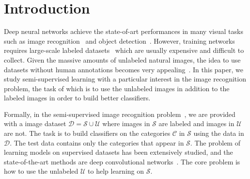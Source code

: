 \documentclass[runningheads]{llncs}
\begin{document}
\vspace{-0.3in}\section{Introduction}%
Deep neural networks achieve the state-of-art performances in many visual tasks such as
image recognition~\cite{resnet,densenet,alexnet,fewshot,vggnet,GoogleNet,sort,znfnet,gunn} and
object detection~\cite{deeplab,rich,fcnn,fasterrcnn}.
However, training networks requires large-scale labeled datasets~\cite{ILSVRC15,coco} which are usually expensive and difficult to collect.
Given the massive amounts of unlabeled natural images, the idea to use datasets without human annotations becomes very appealing~\cite{ssl}.
In this paper, we study semi-supervised learning with a particular interest in the image recognition problem, the task of which is to use the unlabeled images in addition to the labeled images in order to build better classifiers.

Formally, in the semi-supervised image recognition problem~\cite{stoc_trans,tessl,badgan}, we are provided with a image dataset $\mathcal{D}=\mathcal{S}\cup\mathcal{U}$ where images in $\mathcal{S}$ are labeled and images in $\mathcal{U}$ are not.
The task is to build classifiers on the categories $\mathcal{C}$ in $\mathcal{S}$ using the data in $\mathcal{D}$.
The test data contains only the categories that appear in $\mathcal{S}$.
The problem of learning models on supervised datasets has been extensively studied, and the state-of-the-art methods are deep convolutional networks~\cite{resnet,densenet}.
The core problem is how to use the unlabeled $\mathcal{U}$ to help learning on $\mathcal{S}$.
\end{document}
